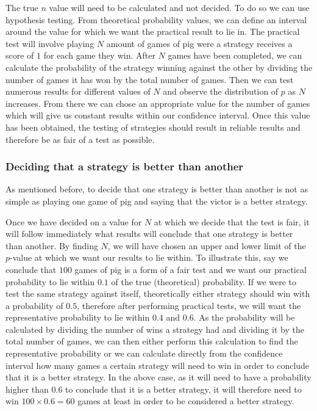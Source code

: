 \documentclass[a4paper,titlepage]{article}
\begin{document}
The true $n$ value will need to be calculated and not decided. To do so we can use hypothesis testing. From theoretical probability values, we can define an interval around the value for which we want the practical result to lie in. The practical test will involve playing $N$ amount of games of pig were a strategy receives a score of $1$ for each game they win. After $N$ games have been completed, we can calculate the probability of the strategy winning against the other by dividing the number of games it has won by the total number of games. Then we can test numerous results for different values of $N$ and observe the distribution of $p$ as $N$ increases. From there we can chose an appropriate value for the number of games which will give us constant results within our confidence interval. Once this value has been obtained, the testing of strategies should result in reliable results and therefore be as fair of a test as possible.
 \subsubsection{Deciding that a strategy is better than another}
As mentioned before, to decide that one strategy is better than another is not as simple as playing one game of pig and saying that the victor is a better strategy.

Once we have decided on a value for $N$ at which we decide that the test is fair, it will follow immediately what results will conclude that one strategy is better than another. By finding $N$, we will have chosen an upper and lower limit of the $p$-value at which we want our results to lie within. To illustrate this, say we conclude that $100$ games of pig is a form of a fair test and we want our practical probability to lie within $0.1$ of the true (theoretical) probability. If we were to test the same strategy against itself, theoretically either strategy should win with a probability of $0.5$, therefore after performing practical tests, we will want the representative probability to lie within $0.4$ and $0.6$. As the probability will be calculated by dividing the number of wins a strategy had and dividing it by the total number of games, we can then either perform this calculation to find the representative probability or we can calculate directly from the confidence interval how many games a certain strategy will need to win in order to conclude that it is a better strategy. In the above case, as it will need to have a probability higher than $0.6$ to conclude that it is a better strategy, it will therefore need to win $100\times0.6=60$ games at least in order to be considered a better strategy.
\end{document}
